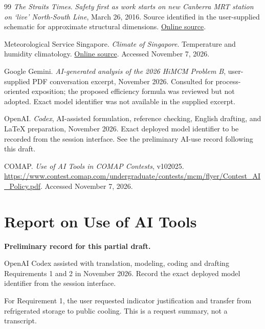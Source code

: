 \documentclass[12pt]{article}
\begin{document}
\begin{thebibliography}{99}
\emph{The Straits Times}. \emph{Safety first as work starts on new Canberra MRT station on `live' North-South Line}, March 26, 2016.
Source identified in the user-supplied schematic for approximate structural dimensions.
\href{https://www.straitstimes.com/singapore/safety-first-as-work-starts-on-new-canberra-mrt-station-on-live-north-south-line}{Online source}.

Meteorological Service Singapore. \emph{Climate of Singapore}. Temperature and humidity climatology.
\href{https://www.weather.gov.sg/climate-climate-of-singapore}{Online source}. Accessed November 7, 2026.

Google Gemini. \emph{AI-generated analysis of the 2026 HiMCM Problem B},
user-supplied PDF conversation excerpt, November 2026.
Consulted for process-oriented exposition; the proposed efficiency formula was
reviewed but not adopted. Exact model identifier was not available in the supplied excerpt.

OpenAI. \emph{Codex}, AI-assisted formulation, reference checking,
English drafting, and LaTeX preparation, November 2026.
Exact deployed model identifier to be recorded from the session interface.
See the preliminary AI-use record following this draft.

COMAP. \emph{Use of AI Tools in COMAP Contests}, v102025.
\url{https://www.contest.comap.com/undergraduate/contests/mcm/flyer/Contest_AI_Policy.pdf}.
Accessed November 7, 2026.
\end{thebibliography}

\clearpage
{}
{}
\section*{Report on Use of AI Tools}
\noindent\textbf{Preliminary record for this partial draft.}

OpenAI Codex assisted with translation, modeling, coding and drafting Requirements
1 and 2 in November 2026. Record the exact deployed model identifier from the session interface.

For Requirement 1, the user requested indicator justification and transfer from
refrigerated storage to public cooling. This is a request summary, not a transcript.
\end{document}
